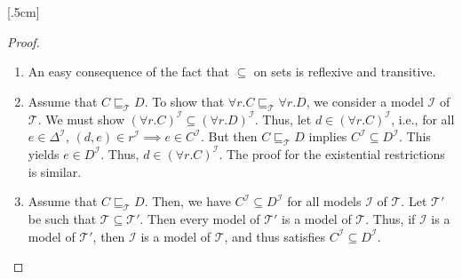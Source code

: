 [.5cm]
\begin{proof}
	\begin{enumerate}
		\item An easy consequence of the fact that $\subseteq$ on sets is reflexive and transitive.
		\item Assume that $C \sqsubseteq_{\mathcal{T}} D$.
			To show that $\forall r.C \sqsubseteq_{\mathcal{T}} \forall r.D$, we consider a model $\mathcal{I}$ of $\mathcal{T}$.
			We must show $ \left( \forall r.C \right)^{\mathcal{I}} \subseteq \left( \forall r.D \right)^{\mathcal{I}}$.
			Thus, let $d \in \left( \forall r.C \right)^{\mathcal{I}}$, i.e., for all $e \in \Delta^{\mathcal{I}}$,
			$\left( d,e \right) \in r^{\mathcal{I}} \implies e \in C^{\mathcal{I}}$.
			But then $C \sqsubseteq_{\mathcal{T}} D$ implies $C^{\mathcal{I}} \subseteq D^{\mathcal{I}}$.
			This yields $e \in D^{\mathcal{I}}$.
			Thus, $d \in \left( \forall r.C \right)^{\mathcal{I}}$.
			The proof for the existential restrictions is similar.
		\item Assume that $C \sqsubseteq_{\mathcal{T}} D$.
			Then, we have $C^{\mathcal{I}} \subseteq D^{\mathcal{I}}$ for all models $\mathcal{I}$ of $\mathcal{T}$.
			Let $\mathcal{T}'$ be such that $\mathcal{T} \subseteq \mathcal{T}'$.
			Then every model of $\mathcal{T}'$ is a model of $\mathcal{T}$.
			Thus, if $\mathcal{I}$ is a model of $\mathcal{T}'$, then $\mathcal{I}$ is a model of $\mathcal{T}$,
			and thus satisfies $C^{\mathcal{I}} \subseteq D^{\mathcal{I}}$.
			\qedhere
	\end{enumerate}
\end{proof}


